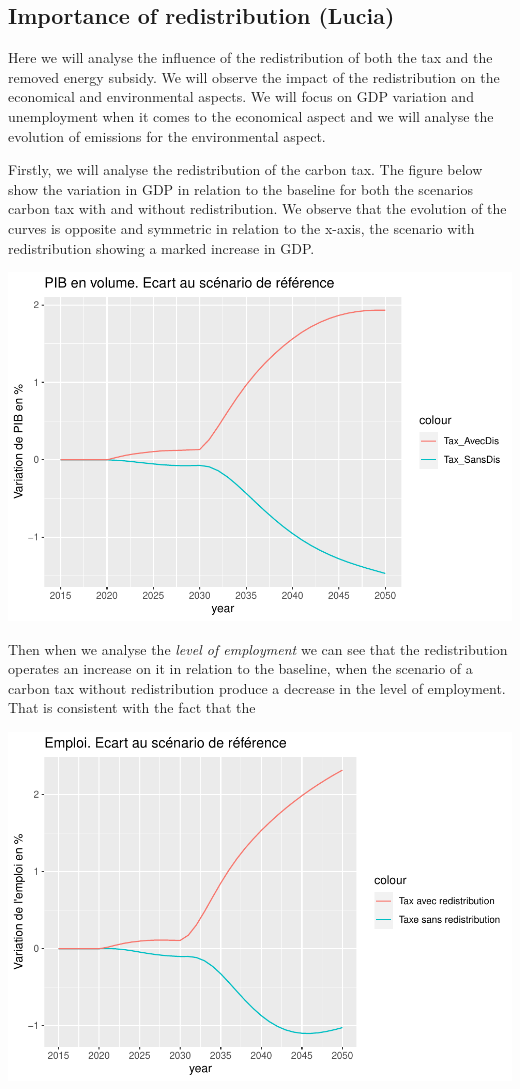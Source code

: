 \documentclass[
]{article}
\begin{document}
\hypertarget{importance-of-redistribution-lucia}{%
\subsection{Importance of redistribution
(Lucia)}\label{importance-of-redistribution-lucia}}

Here we will analyse the influence of the redistribution of both the tax
and the removed energy subsidy. We will observe the impact of the
redistribution on the economical and environmental aspects. We will
focus on GDP variation and unemployment when it comes to the economical
aspect and we will analyse the evolution of emissions for the
environmental aspect.

Firstly, we will analyse the redistribution of the carbon tax. The
figure below show the variation in GDP in relation to the baseline for
both the scenarios carbon tax with and without redistribution. We
observe that the evolution of the curves is opposite and symmetric in
relation to the x-axis, the scenario with redistribution showing a
marked increase in GDP.

\begin{center}\includegraphics[width=0.7\linewidth,height=0.7\textheight]{Modele-ThreeMe-Tunisie_Sequeira_Valilou_Wang_files/figure-latex/unnamed-chunk-8-1} \end{center}

Then when we analyse the \emph{level of employment} we can see that the
redistribution operates an increase on it in relation to the baseline,
when the scenario of a carbon tax without redistribution produce a
decrease in the level of employment. That is consistent with the fact
that the

\begin{center}\includegraphics[width=0.7\linewidth,height=0.7\textheight]{Modele-ThreeMe-Tunisie_Sequeira_Valilou_Wang_files/figure-latex/unnamed-chunk-9-1} \end{center}
\end{document}
